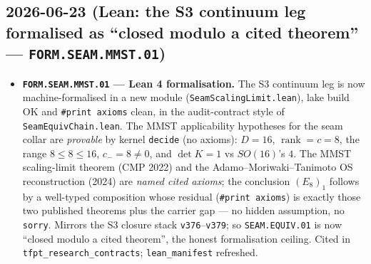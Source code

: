 \documentclass[11pt]{article}
\begin{document}
\subsection*{2026-06-23 (Lean: the S3 continuum leg formalised as ``closed modulo a cited theorem'' --- \texttt{FORM.SEAM.MMST.01})}
\begin{itemize}
\item \textbf{\texttt{FORM.SEAM.MMST.01} --- Lean 4 formalisation.} The S3 continuum leg is now
machine-formalised in a new module (\texttt{SeamScalingLimit.lean}), lake build OK and \texttt{\#print axioms}
clean, in the audit-contract style of \texttt{SeamEquivChain.lean}. The MMST applicability hypotheses for the seam collar
are \emph{provable} by kernel \texttt{decide} (no axioms): $D = 16$, $\operatorname{rank} = c = 8$, the range
$8 \le 8 \le 16$, $c_- = 8 \neq 0$, and $\det K = 1$ vs $SO(16)$'s $4$. The MMST scaling-limit theorem (CMP 2022) and
the Adamo--Moriwaki--Tanimoto OS reconstruction (2024) are \emph{named cited axioms}; the conclusion
$(E_8)_1$ follows by a well-typed composition whose residual (\texttt{\#print axioms}) is exactly those two
published theorems plus the carrier gap --- no hidden assumption, no \texttt{sorry}. Mirrors the S3 closure
stack \texttt{v376}--\texttt{v379}; so \texttt{SEAM.EQUIV.01} is now ``closed modulo a cited theorem'', the
honest formalisation ceiling. Cited in \texttt{tfpt\_research\_contracts}; \texttt{lean\_manifest} refreshed.
\end{itemize}
\end{document}
